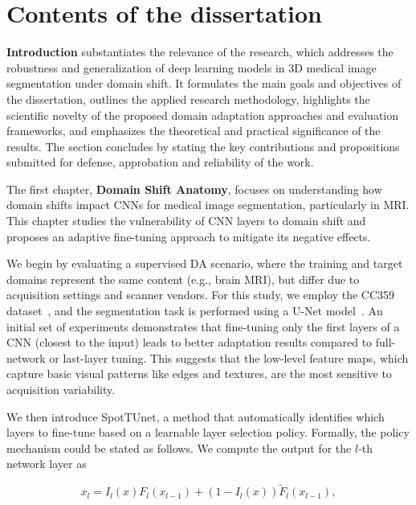 

\section*{Contents of the dissertation}


\textbf{Introduction} substantiates the relevance of the research, which addresses the robustness and generalization of deep learning models in 3D medical image segmentation under domain shift. It formulates the main goals and objectives of the dissertation, outlines the applied research methodology, highlights the scientific novelty of the proposed domain adaptation approaches and evaluation frameworks, and emphasizes the theoretical and practical significance of the results. The section concludes by stating the key contributions and propositions submitted for defense, approbation and reliability of the work.




The first chapter, \textbf{Domain Shift Anatomy}, focuses on understanding how domain shifts impact CNNs for medical image segmentation, particularly in MRI. This chapter studies the vulnerability of CNN layers to domain shift and proposes an adaptive fine-tuning approach to mitigate its negative effects.

We begin by evaluating a supervised DA scenario, where the training and target domains represent the same content (e.g., brain MRI), but differ due to acquisition settings and scanner vendors. For this study, we employ the CC359 dataset~\cite{cc359}, and the segmentation task is performed using a U-Net model~\cite{unet}. An initial set of experiments demonstrates that fine-tuning only the first layers of a CNN (closest to the input) leads to better adaptation results compared to full-network or last-layer tuning. This suggests that the low-level feature maps, which capture basic visual patterns like edges and textures, are the most sensitive to acquisition variability.

We then introduce SpotTUnet, a method that automatically identifies which layers to fine-tune based on a learnable layer selection policy. Formally, the policy mechanism could be stated as follows. We compute the output for the $l$-th network layer as


\begin{equation}
	x_l = I_l ( x ) F_l ( x_{l-1} ) + (1 - I_l ( x )) \tilde{F}_l ( x_{l-1} ),
\end{equation}

